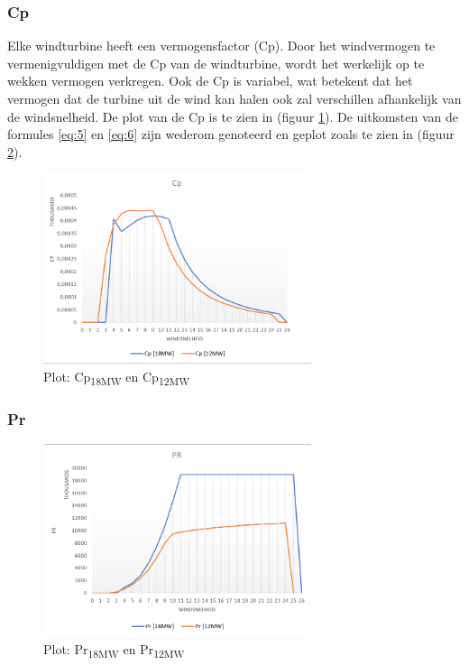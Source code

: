 \subsubsection{Cp}
Elke windturbine heeft een vermogensfactor (Cp). Door het windvermogen te vermenigvuldigen met de Cp van de windturbine, wordt het werkelijk op te wekken vermogen verkregen. Ook de Cp is variabel, wat betekent dat het vermogen dat de turbine uit de wind kan halen ook zal verschillen afhankelijk van de windsnelheid. De plot van de Cp is te zien in (figuur \ref{fig:CpGraph}). De uitkomsten van de formules \ref{eq:5} en \ref{eq:6} zijn wederom genoteerd en geplot zoals te zien in (figuur \ref{fig:PrGraph}). 
\begin{figure}[H]
\centering
\includegraphics[width=0.7\textwidth]{IMG/data/overzicht/Cp_graph.PNG}
\caption{Plot: Cp\textsubscript{18MW} en Cp\textsubscript{12MW}}
\label{fig:CpGraph}
\end{figure}
\subsubsection{Pr}
\begin{figure}[H]
\centering
\includegraphics[width=0.7\textwidth]{IMG/data/overzicht/Pr_graph.PNG}
\caption{Plot: Pr\textsubscript{18MW} en Pr\textsubscript{12MW}}
\label{fig:PrGraph}
\end{figure}



